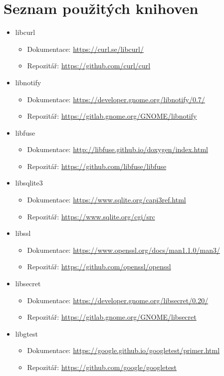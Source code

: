 \chapter{Seznam použitých knihoven}

\begin{itemize}
    \item libcurl
    \begin{itemize}
        \item Dokumentace: \url{https://curl.se/libcurl/}
        \item Repozitář: \url{https://github.com/curl/curl}
    \end{itemize}
    \item libnotify
    \begin{itemize}
        \item Dokumentace: \url{https://developer.gnome.org/libnotify/0.7/}
        \item Repozitář: \url{https://gitlab.gnome.org/GNOME/libnotify}
    \end{itemize}
    \item libfuse
    \begin{itemize}
        \item Dokumentace: \url{http://libfuse.github.io/doxygen/index.html}
        \item Repozitář: \url{https://github.com/libfuse/libfuse}
    \end{itemize}
    \item libsqlite3
    \begin{itemize}
        \item Dokumentace: \url{https://www.sqlite.org/capi3ref.html}
        \item Repozitář: \url{https://www.sqlite.org/cgi/src}
    \end{itemize}
    \item libssl
    \begin{itemize}
        \item Dokumentace: \url{https://www.openssl.org/docs/man1.1.0/man3/}
        \item Repozitář: \url{https://github.com/openssl/openssl}
    \end{itemize}
    \item libsecret
    \begin{itemize}
        \item Dokumentace: \url{https://developer.gnome.org/libsecret/0.20/}
        \item Repozitář: \url{https://gitlab.gnome.org/GNOME/libsecret}
    \end{itemize}
    \item libgtest
    \begin{itemize}
        \item Dokumentace: \url{https://google.github.io/googletest/primer.html}
        \item Repozitář: \url{https://github.com/google/googletest}
    \end{itemize}
\end{itemize}

